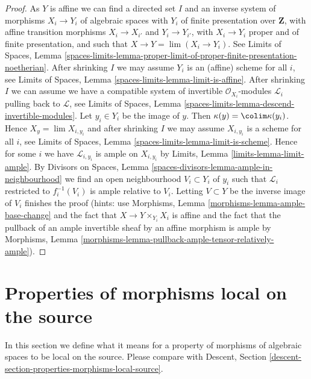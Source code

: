 \begin{proof}
\medskip\noindent
As $Y$ is affine we can find a directed set $I$ and an
inverse system of morphisms $X_i \to Y_i$ of algebraic spaces
with $Y_i$ of finite presentation over $\mathbf{Z}$, with affine
transition morphisms $X_i \to X_{i'}$ and $Y_i \to Y_{i'}$,
with $X_i \to Y_i$ proper and of finite presentation, and such that
$X \to Y = \lim (X_i \to Y_i)$. See Limits of Spaces, Lemma
\ref{spaces-limits-lemma-proper-limit-of-proper-finite-presentation-noetherian}.
After shrinking $I$ we may assume $Y_i$ is an (affine) scheme for all $i$,
see Limits of Spaces, Lemma \ref{spaces-limits-lemma-limit-is-affine}.
After shrinking $I$ we can assume we have a compatible system of
invertible $\mathcal{O}_{X_i}$-modules $\mathcal{L}_i$
pulling back to $\mathcal{L}$, see
Limits of Spaces, Lemma \ref{spaces-limits-lemma-descend-invertible-modules}.
Let $y_i \in Y_i$ be the image of $y$.
Then $\kappa(y) = \colim \kappa(y_i)$.
Hence $X_y = \lim X_{i, y_i}$ and after shrinking $I$ we
may assume $X_{i, y_i}$ is a scheme for all $i$, see
Limits of Spaces, Lemma \ref{spaces-limits-lemma-limit-is-scheme}.
Hence for some $i$ we have $\mathcal{L}_{i, y_i}$
is ample on $X_{i, y_i}$ by
Limits, Lemma \ref{limits-lemma-limit-ample}.
By Divisors on Spaces, Lemma \ref{spaces-divisors-lemma-ample-in-neighbourhood}
we find an open neighbourhood
$V_i \subset Y_i$ of $y_i$ such that
$\mathcal{L}_i$ restricted to $f_i^{-1}(V_i)$
is ample relative to $V_i$.
Letting $V \subset Y$ be the inverse image of
$V_i$ finishes the proof (hints: use
Morphisms, Lemma \ref{morphisms-lemma-ample-base-change} and
the fact that $X \to Y \times_{Y_i} X_i$ is affine
and the fact that the pullback of an
ample invertible sheaf by an affine morphism is ample by
Morphisms, Lemma \ref{morphisms-lemma-pullback-ample-tensor-relatively-ample}).
\end{proof}













\section{Properties of morphisms local on the source}
\label{section-properties-morphisms-local-source}

\noindent
In this section we define what it means for a property of morphisms of
algebraic spaces to be local on the source. Please compare with
Descent, Section \ref{descent-section-properties-morphisms-local-source}.

